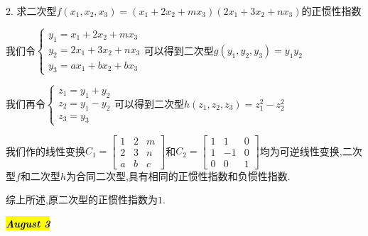 2. 求二次型$f(x_{1},x_{2},x_{3})=(x_{1}+2x_{2}+mx_{3})(2x_{1}+3x_{2}+nx_{3})$的正惯性指数
\begin{solution}

	我们令$\left\lbrace
	\begin{array}{l}
		y_{1}=x_{1}+2x_{2}+mx_{3}\\
		y_{2}=2x_{1}+3x_{2}+nx_{3}\\
		y_{3}=ax_{1}+bx_{2}+bx_{3}
	\end{array}
	\right. $可以得到二次型$g(y_{1},y_{2},y_{3})=y_{1}y_{2}$
	
	我们再令$\left\lbrace
	\begin{array}{l}
		z_{1}=y_{1}+y_{2}\\
		z_{2}=y_{1}-y_{2}\\
		z_{3}=y_{3}
	\end{array}
	\right. $可以得到二次型$h(z_{1},z_{2},z_{3})=z_{1}^2-z_{2}^2$
	
	我们作的线性变换$C_{1}=\left[ \begin{matrix}
		1&2&m\\2&3&n\\a&b&c
	\end{matrix}\right] $和$C_{2}=\left[ \begin{matrix}
	1&1&0\\1&-1&0\\0&0&1
\end{matrix}\right] $均为可逆线性变换,二次型$f$和二次型$h$为合同二次型,具有相同的正惯性指数和负惯性指数.

综上所述,原二次型的正惯性指数为$1$.
\end{solution}

\hl{\textbf{\textit{August 3}}}

